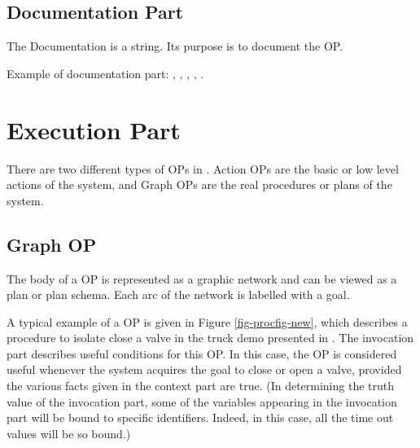 \subsection{Documentation Part}

The Documentation is a string. Its purpose is to document the OP.

Example of documentation part: \*
, \*
, \*
,
\*
, \*
.

\section{Execution Part}

There are two different types of OPs in \COPRS{}. Action OPs are the
basic or low level actions of the system, and Graph OPs are the real
procedures or plans of the system.



\subsection{Graph OP}

The body of a OP is represented as a graphic network and can be viewed as a
plan or plan schema. Each arc of the network is labelled with a goal.


A typical example of a OP is given in Figure \ref{fig-procfig-new}, which
describes a procedure to isolate close a valve in the truck demo presented in
. The invocation part describes useful 
conditions for this OP. In this case, the OP is considered useful
whenever the system acquires the goal to close or open a valve, provided the
various facts given in the context part are true.  (In determining the truth
value of the invocation part, some of the variables appearing in the invocation
part will be bound to specific identifiers. Indeed, in this case, all the time
out values will be so bound.)



